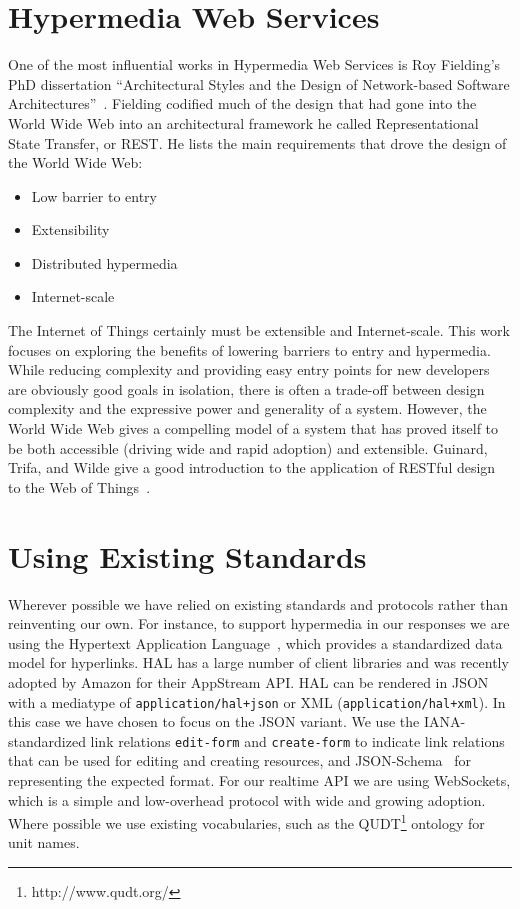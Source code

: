 \documentclass{acm_proc_article-sp}
\newenvironment{tightitemize}{
    \vspace{-10pt}
    \begin{itemize}
        \setlength{\parskip}{-1pt}}{
    \end{itemize}
    \vspace{-10pt}}
\begin{document}
\section{Hypermedia Web Services}

One of the most influential works in Hypermedia Web Services is Roy Fielding's
PhD dissertation ``Architectural Styles and the Design of Network-based
Software Architectures''~\cite{fielding}. Fielding codified much of the design
that had gone into the World Wide Web into an architectural framework he called
Representational State Transfer, or REST. He lists the main requirements that
drove the design of the World Wide Web:

\begin{tightitemize}
    \item Low barrier to entry
    \item Extensibility
    \item Distributed hypermedia
    \item Internet-scale
\end{tightitemize}

The Internet of Things certainly must be extensible and Internet-scale. This
work focuses on exploring the benefits of lowering barriers to entry and
hypermedia. While reducing complexity and providing easy entry points for new
developers are obviously good goals in isolation, there is often a trade-off
between design complexity and the expressive power and generality of a system.
However, the World Wide Web gives a compelling model of a system that has
proved itself to be both accessible (driving wide and rapid adoption) and
extensible. Guinard, Trifa, and Wilde give a good introduction to the
application of RESTful design to the Web of Things~\cite{guinard2010}.

\section{Using Existing Standards}

Wherever possible we have relied on existing standards and protocols rather
than reinventing our own. For instance, to support hypermedia in our responses
we are using the Hypertext Application Language~\cite{json-hal-draft}, which
provides a standardized data model for hyperlinks. HAL has a large number of
client libraries and was recently adopted by Amazon for their AppStream API.
HAL can be rendered in JSON with a mediatype of \texttt{application/hal+json}
or XML (\texttt{application/hal+xml}). In this case we have chosen to focus on
the JSON variant. We use the IANA-standardized link relations
\texttt{edit-form} and \texttt{create-form} to indicate link relations that can
be used for editing and creating resources, and
JSON-Schema~\cite{json-schema-draft} for representing the expected format. For
our realtime API we are using WebSockets, which is a simple and low-overhead
protocol with wide and growing adoption. Where possible we use existing
vocabularies, such as the QUDT\footnote{http://www.qudt.org/} ontology for unit
names.
\end{document}
